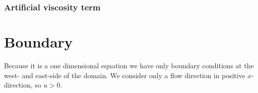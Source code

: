 \subsubsection*{Artificial viscosity term}
\notyet

%
%

\section{Boundary}
Because it is a one dimensional equation we have only boundary conditions at the west- and east-side of the domain.
We consider only a flow direction in positive $x$-direction, so $u>0$.

